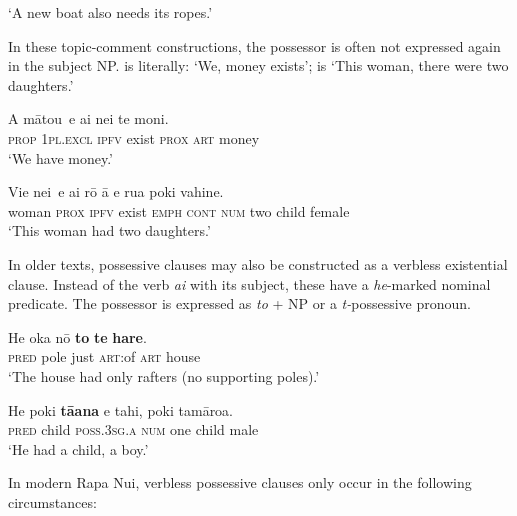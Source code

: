 \glt
‘A new boat also needs its ropes.’ \textstyleExampleref{[R200.083]} 
\z

In these topic-comment constructions, the possessor is often not expressed again in the subject NP.  is literally: ‘We, money exists’;  is ‘This woman, there were two daughters.’

\ea\label{ex:9.75}
\gll {\ob}A mātou\,{\cb} e ai nei te moni. \\
{\db}\textsc{prop} \textsc{1pl.excl} \textsc{ipfv} exist \textsc{prox} \textsc{art} money \\

\glt 
‘We have money.’ \textstyleExampleref{[R621.027]} 
\z

\ea\label{ex:9.76}
\gll {\ob}Vi{\ꞌ}e nei\,{\cb} e ai rō {\ꞌ}ā e rua poki vahine. \\
{\db}woman \textsc{prox} \textsc{ipfv} exist \textsc{emph} \textsc{cont} \textsc{num} two child female \\

\glt 
‘This woman had two daughters.’ \textstyleExampleref{[R491.008]} 
\z

In older texts, possessive clauses may also be constructed as a verbless existential clause. Instead of the verb \textit{ai} with its subject, these have a \textit{he}-marked nominal predicate. The possessor is expressed as \textit{to} + NP or a \textit{t-}possessive pronoun. 

\ea\label{ex:9.77}
\gll He {\ꞌ}oka nō \textbf{to} \textbf{te} \textbf{hare}. \\
\textsc{pred} pole just \textsc{art}:of \textsc{art} house \\

\glt 
‘The house had only rafters (no supporting poles).’ \textstyleExampleref{[Ley-2-12.007]}
\z

\ea\label{ex:9.78}
\gll He poki \textbf{tā{\ꞌ}ana} e tahi, poki tamāroa. \\
\textsc{pred} child \textsc{poss.3sg.a} \textsc{num} one child male \\

\glt
‘He had a child, a boy.’ \textstyleExampleref{[Ley-9-56.002]}
\z

In modern Rapa Nui, verbless possessive clauses only occur in the following circumstances:

